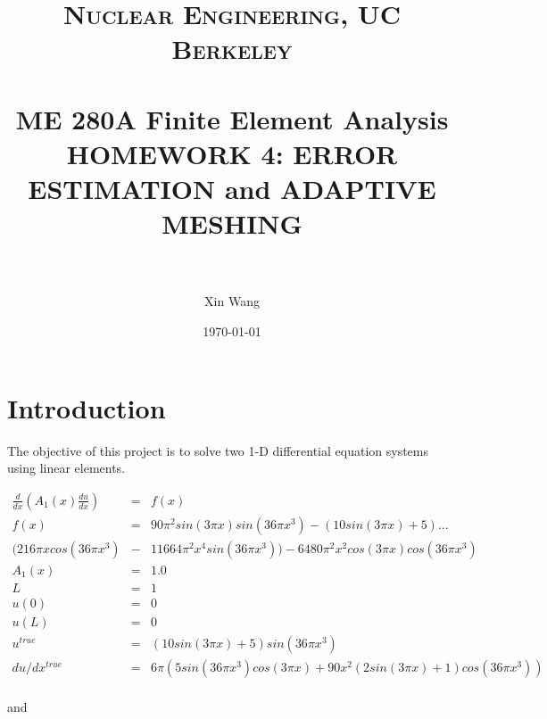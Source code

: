 \documentclass[a4paper, 12pt]{article} %
\title{	
\normalfont \normalsize 
\textsc{Nuclear Engineering, UC Berkeley} \\ [25pt] %
\horrule{0.5pt} \\[0.4cm] %
\huge ME 280A Finite Element Analysis \\HOMEWORK 4: ERROR ESTIMATION and ADAPTIVE MESHING  \\  %
\horrule{2pt} \\[0.5cm] %
}
\author{Xin Wang} %
\date{\normalsize\today} %
\begin{document}
\maketitle %

\newpage

\section{Introduction}

The objective of this project is to solve two 1-D differential equation systems using linear elements.  


\begin{eqnarray}
\frac{d}{dx}(A_1(x) \frac{du}{dx}) &=& f(x)\nonumber\\
f(x)&=& 90\pi^2 sin(3\pi x)sin(36\pi x^3) - (10sin(3\pi x) + 5)...\nonumber\\
(216 \pi x cos(36 \pi x^3) &-& 11664 \pi^2 x^4 sin(36 \pi x^3)) - 6480 \pi^2x^2cos(3\pi x)cos(36 \pi x^3) \nonumber\\
A_1(x) &=& 1.0\nonumber\\
L &= &1 \nonumber\\
u(0) &=& 0 \nonumber\\
u(L) &=& 0 \nonumber\\
u^{true} &=& (10 sin(3 \pi x) + 5) sin(36 \pi x^3) \nonumber\\
du/dx^{true} &=& 6\pi (5 sin(36\pi x^3) cos(3\pi x) + 90x^2 (2 sin(3\pi x) +1 ) cos(36 \pi x^3) )\nonumber\\
\end{eqnarray}

and
\end{document}
